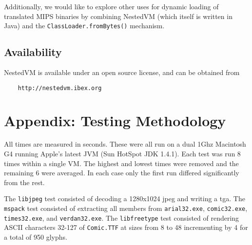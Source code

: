 \documentclass{acmconf}
\begin{document}
Additionally, we would like to explore other uses for dynamic loading
of translated MIPS binaries by combining NestedVM (which itself is
written in Java) and the {\tt ClassLoader.fromBytes()} mechanism.

\subsection{Availability}

NestedVM is available under an open source license, and can be
obtained from
\begin{verbatim}
    http://nestedvm.ibex.org
\end{verbatim}

\appendix
\section{Appendix: Testing Methodology}

All times are measured in seconds. These were all run on a dual 1Ghz
Macintosh G4 running Apple's latest JVM (Sun HotSpot JDK 1.4.1). Each
test was run 8 times within a single VM. The highest and lowest times
were removed and the remaining 6 were averaged.  In each case only the
first run differed significantly from the rest.

The {\tt libjpeg} test consisted of decoding a 1280x1024 jpeg and
writing a tga.  The {\tt mspack} test consisted of extracting all
members from {\tt arial32.exe}, {\tt comic32.exe}, {\tt times32.exe},
and {\tt verdan32.exe}. The {\tt libfreetype} test consisted of
rendering ASCII characters 32-127 of {\tt Comic.TTF} at sizes from 8
to 48 incrementing by 4 for a total of 950 glyphs.


\end{document}
